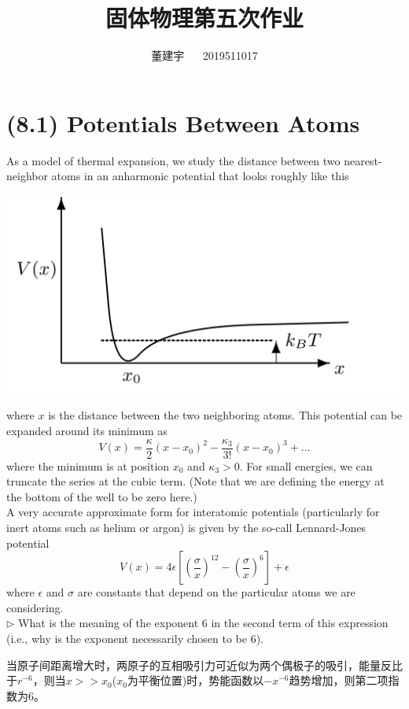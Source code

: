 \documentclass[reqno,a4paper,12pt]{amsart}
\title{固体物理第五次作业}
\author{董建宇 ~~ 2019511017}
\begin{document}
\maketitle
\titleformat{\section}[hang]{\small}{\thesection}{0.8em}{}{}
\titleformat{\subsection}[hang]{\small}{\thesubsection}{0.8em}{}{}

\section{\textbf{(8.1) Potentials Between Atoms}}
As a model of thermal expansion, we study the distance between two nearest-neighbor atoms in an anharmonic potential that looks roughly like this 
\begin{center}
	\includegraphics[scale = 0.25]{8-1.jpeg}
\end{center} 
where $x$ is the distance between the two neighboring atoms. This potential can be expanded around its minimum as 
\[
	V(x) = \frac{\kappa}{2}(x-x_0)^2 - \frac{\kappa_3}{3!}(x-x_0)^3 + \dots
\]
where the minimum is at position $x_0$ and $\kappa_3>0$. For small energies, we can truncate the series at the cubic term. (Note that we are defining the energy at the bottom of the well to be zero here.) \\
A very accurate approximate form for interatomic potentials (particularly for inert atoms such as helium or argon) is given by the so-call Lennard-Jones potential 
\[
	V(x) = 4\epsilon \left[ \left(\frac{\sigma}{x}\right)^{12} - \left( \frac{\sigma}{x} \right)^6 \right] + \epsilon
\]
where $\epsilon$ and $\sigma$ are constants that depend on the particular atoms we are considering. \\
$\triangleright$ What is the meaning of the exponent 6 in the second term of this expression (i.e., why is the exponent necessarily chosen to be 6). 
\begin{tcolorbox}[breakable, colback = black!5!white, colframe = black]
	当原子间距离增大时，两原子的互相吸引力可近似为两个偶极子的吸引，能量反比于$r^{-6}$，则当$x >> x_0$($x_0$为平衡位置)时，势能函数以$-x^{-6}$趋势增加，则第二项指数为$6$。
\end{tcolorbox}
\end{document}
